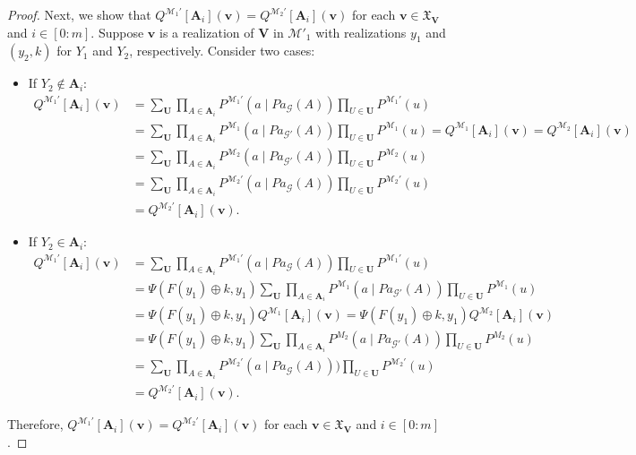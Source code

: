 \documentclass[accepted]{uai2022}
\newcommand{\Pa}[2]{\textit{Pa}_{#2}(#1)}
\newcommand{\V}[0]{\mathbf{V}}
\newcommand{\U}[0]{\mathbf{U}}
\newcommand{\A}[0]{\mathbf{A}}
\newcommand{\G}[0]{\mathcal{G}}
\newcommand{\M}[0]{\mathcal{M}}
\newcommand{\dom}[1]{\mathfrak{X}_{#1}}
\begin{document}
\begin{proof}
            Next, we show that $Q^{\M_1'}[\A_i](\mathbf{v}) = Q^{\M_2'}[\A_i](\mathbf{v})$ for each $\mathbf{v}\in \dom{\V}$ and $i \in [0:m]$.
            Suppose $\mathbf{v}$ is a realization of $\V$ in $\M'_1$ with realizations $y_1$ and $(y_2, k)$ for $Y_1$ and $Y_2$, respectively. 
            Consider two cases: 
            \begin{itemize}
                \item If $Y_2 \notin \A_i$:
                \begin{align*}
                    Q^{\M_1'}[\A_i](\mathbf{v}) 
                    &= \sum_{\U}\prod_{A\in \A_i} P^{\M_1'}(a \mid \Pa{A}{\G})\prod_{U\in \U}P^{\M_1'}(u) \\
                    & = \sum_{\U} \prod_{A\in \A_i}P^{\M_1}(a \mid \Pa{A}{\G'})\prod_{U\in \U} P^{\M_1}(u) 
                    = Q^{\M_1}[\A_i](\mathbf{v}) 
                    = Q^{\M_2}[\A_i](\mathbf{v}) \\
                    & = \sum_{\U} \prod_{A\in \A_i} P^{\M_2}(a \mid \Pa{A}{\G'}) \prod_{U\in \U} P^{\M_2}(u) \\
                    &= \sum_{\U} \prod_{A\in \A_i} P^{\M_2'}(a \mid \Pa{A}{\G}) \prod_{U\in \U} P^{\M_2'}(u) \\ 
                    &= Q^{\M_2'}[\A_i](\mathbf{v}).
                \end{align*}
                \item If $Y_2 \in \mathbf{A}_i$:
                \begin{align*}
                    Q^{\M_1'}[\A_i](\mathbf{v}) 
                    &= \sum_{\U} \prod_{A\in \A_i} P^{\M_1'} (a \mid \Pa{A}{\G})\prod_{U\in \U} P^{\M_1'}(u) \\
                    & = \Psi\left(F(y_1)\oplus k, y_1\right) \sum_{\U} \prod_{A\in \A_i} P^{\M_1}(a \mid  \Pa{A}{\G'}) \prod_{U\in \U}P^{\M_1}(u) \\
                    &= \Psi(F(y_1)\oplus k, y_1) Q^{\M_1}[\A_i](\mathbf{v}) = \Psi(F(y_1)\oplus k, y_1) Q^{\M_2}[\A_i](\mathbf{v}) \\
                    &= \Psi(F(y_1)\oplus k, y_1) \sum_{\U} \prod_{A\in \A_i} P^{M_2}(a \mid \Pa{A}{\G'}) \prod_{U\in \U} P^{M_2}(u) \\
                    &= \sum_{\U}\prod_{A\in \A_i} P^{\M_2'}(a \mid \Pa{A}{\G})) \prod_{U\in \U}P^{\M_2'}(u) \\
                    &= Q^{\M_2'}[\A_i](\mathbf{v}).
                \end{align*}
            \end{itemize}
            Therefore, $Q^{\M_1'}[\A_i](\mathbf{v}) = Q^{\M_2'}[\A_i](\mathbf{v})$ for each $\mathbf{v}\in \dom{\V}$ and $i \in [0:m]$.
            

\end{proof}
\end{document}
